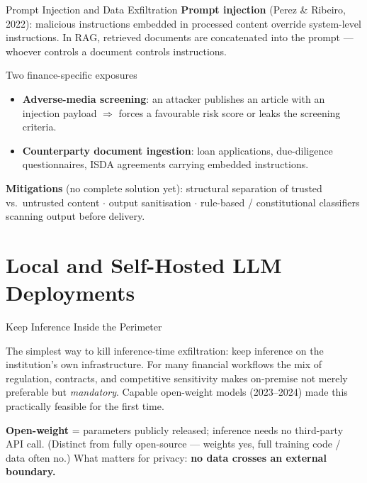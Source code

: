 \documentclass[9pt,t]{beamer}
\begin{document}
\begin{frame}{Prompt Injection and Data Exfiltration}
\textbf{Prompt injection} (Perez \& Ribeiro, 2022): malicious instructions embedded
in processed content override system-level instructions. In RAG, retrieved documents
are concatenated into the prompt --- whoever controls a document controls instructions.

\medskip
\begin{block}{Two finance-specific exposures}
\begin{itemize}
  \item \textbf{Adverse-media screening}: an attacker publishes an article with an
        injection payload $\Rightarrow$ forces a favourable risk score or leaks the
        screening criteria.
  \item \textbf{Counterparty document ingestion}: loan applications, due-diligence
        questionnaires, ISDA agreements carrying embedded instructions.
\end{itemize}
\end{block}

\medskip
\textbf{Mitigations} (no complete solution yet):
structural separation of trusted vs.\ untrusted content $\cdot$ output sanitisation
$\cdot$ rule-based / constitutional classifiers scanning output before delivery.
\end{frame}

\section{Local and Self-Hosted LLM Deployments}

\begin{frame}{Keep Inference Inside the Perimeter}
\begin{bigpicture}
The simplest way to kill inference-time exfiltration: keep inference on the
institution's own infrastructure. For many financial workflows the mix of
regulation, contracts, and competitive sensitivity makes on-premise not merely
preferable but \emph{mandatory}. Capable open-weight models (2023--2024) made this
practically feasible for the first time.
\end{bigpicture}

\medskip
\textbf{Open-weight} = parameters publicly released; inference needs no third-party
API call. (Distinct from fully open-source --- weights yes, full training
code / data often no.) What matters for privacy: \textbf{no data crosses an external
boundary.}
\end{frame}
\end{document}
